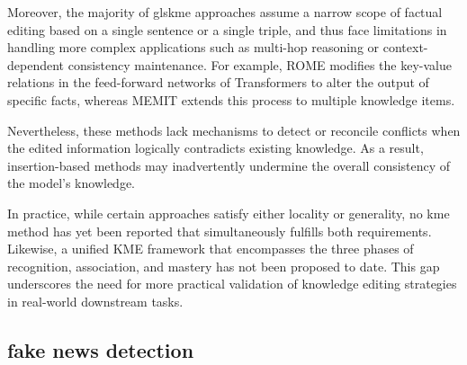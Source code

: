 \documentclass[a4paper,fleqn]{cas-sc}
\begin{document}
Moreover, the majority of gls{kme} approaches assume a narrow scope of factual editing based on a single sentence or a single triple, and thus face limitations in handling more complex applications such as multi-hop reasoning or context-dependent consistency maintenance. For example, ROME modifies the key-value relations in the feed-forward networks of Transformers to alter the output of specific facts, whereas MEMIT extends this process to multiple knowledge items.

Nevertheless, these methods lack mechanisms to detect or reconcile conflicts when the edited information logically contradicts existing knowledge.
As a result, insertion-based methods may inadvertently undermine the overall consistency of the model's knowledge.

In practice, while certain approaches satisfy either locality or generality, no \gls{kme} method has yet been reported that simultaneously fulfills both requirements. Likewise, a unified KME framework that encompasses the three phases of recognition, association, and mastery has not been proposed to date.
This gap underscores the need for more practical validation of knowledge editing strategies in real-world downstream tasks.

\subsection{fake news detection}
\end{document}
